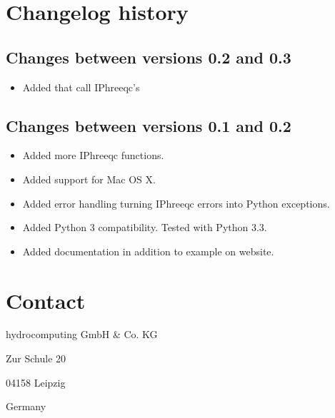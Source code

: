 \documentclass[letterpaper,10pt,english]{sphinxmanual}
\begin{document}
\begin{sphinxVerbatim}[commandchars=\\\{\}]
   
     
\end{sphinxVerbatim}


\chapter{Changelog history}
\label{\detokenize{changelog:changelog-history}}\label{\detokenize{changelog:changelog}}\label{\detokenize{changelog::doc}}

\section{Changes between versions 0.2 and 0.3}
\label{\detokenize{changelog:changes-between-versions-0-2-and-0-3}}\begin{itemize}
\item {} 
Added  that call IPhreeqc’s 

\end{itemize}


\section{Changes between versions 0.1 and 0.2}
\label{\detokenize{changelog:changes-between-versions-0-1-and-0-2}}\begin{itemize}
\item {} 
Added more IPhreeqc functions.

\item {} 
Added support for Mac OS X.

\item {} 
Added error handling turning IPhreeqc errors into Python exceptions.

\item {} 
Added Python 3 compatibility. Tested with Python 3.3.

\item {} 
Added documentation in addition to example on website.

\end{itemize}


\chapter{Contact}
\label{\detokenize{contact:contact}}\label{\detokenize{contact::doc}}
\begin{DUlineblock}{0em}
\item[] hydrocomputing GmbH \& Co. KG
\item[] Zur Schule 20
\item[] 04158 Leipzig
\item[] Germany
\end{DUlineblock}
\end{document}
